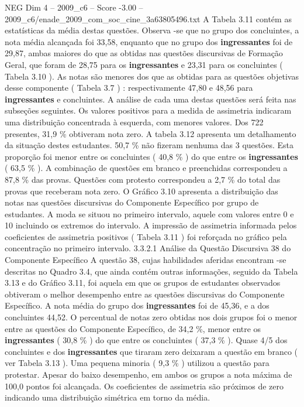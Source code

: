 \begin{textsample}{NEG Dim 4 – 2009\_c6 – Score -3.00 – 2009\_c6/enade\_2009\_com\_soc\_cine\_3a63805496.txt}
A Tabela 3.11 contém as estatísticas da média destas questões.
Observa -se que no grupo dos concluintes, a nota média alcançada foi 33,58, enquanto que no grupo dos \textbf{ingressantes} foi de 29,87, ambas maiores do que as obtidas nas questões discursivas de Formação Geral, que foram de 28,75 para os \textbf{ingressantes} e 23,31 para os concluintes ( Tabela 3.10 ).
As notas são menores dos que as obtidas para as questões objetivas desse componente ( Tabela 3.7 ) : respectivamente 47,80 e 48,56 para \textbf{ingressantes} e concluintes.
A análise de cada uma destas questões será feita nas subseções seguintes.
Os valores positivos para a medida de assimetria indicaram uma distribuição concentrada à esquerda, com menores valores.
Dos 722 presentes, 31,9 \% obtiveram nota zero.
A tabela 3.12 apresenta um detalhamento da situação destes estudantes. 50,7 \% não fizeram nenhuma das 3 questões.
Esta proporção foi menor entre os concluintes ( 40,8 \% ) do que entre os \textbf{ingressantes} ( 63,5 \% ).
A combinação de questões em branco e preenchidas correspondeu a 87,8 \% das provas.
Questões com protesto correspondeu a 2,7 \% do total das provas que receberam nota zero.
O Gráfico 3.10 apresenta a distribuição das notas nas questões discursivas do Componente Específico por grupo de estudantes.
A moda se situou no primeiro intervalo, aquele com valores entre 0 e 10 incluindo os extremos do intervalo.
A impressão de assimetria informada pelos coeficientes de assimetria positivos ( Tabela 3.11 ) foi reforçada no gráfico pela concentração no primeiro intervalo. 3.3.2.1 Análise da Questão Discursiva 38 do Componente Específico A questão 38, cujas habilidades aferidas encontram -se descritas no Quadro 3.4, que ainda contém outras informações, seguido da Tabela 3.13 e do Gráfico 3.11, foi aquela em que os grupos de estudantes observados obtiveram o melhor desempenho entre as questões discursivas do Componente Específico.
A nota média do grupo dos \textbf{ingressantes} foi de 45,36, e a dos concluintes 44,52.
O percentual de notas zero obtidas nos dois grupos foi o menor entre as questões do Componente Específico, de 34,2 \%, menor entre os \textbf{ingressantes} ( 30,8 \% ) do que entre os concluintes ( 37,3 \% ).
Quase 4/5 dos concluintes e dos \textbf{ingressantes} que tiraram zero deixaram a questão em branco ( ver Tabela 3.13 ).
Uma pequena minoria ( 9,3 \% ) utilizou a questão para protestar.
Apesar do baixo desempenho, em ambos os grupos a nota máxima de 100,0 pontos foi alcançada.
Os coeficientes de assimetria são próximos de zero indicando uma distribuição simétrica em torno da média.

\end{textsample}
